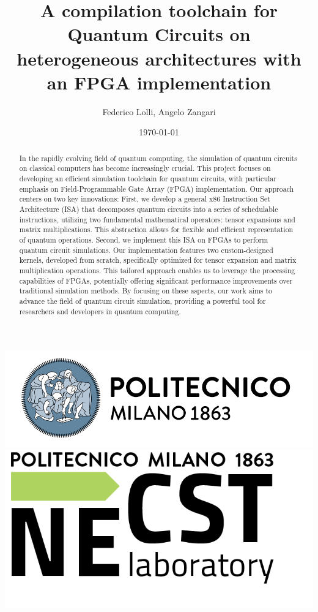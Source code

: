 \documentclass[12pt,oneside,a4paper]{article}
\title{\textbf{A compilation toolchain for Quantum Circuits on heterogeneous architectures with an FPGA implementation}}
\author{Federico Lolli, Angelo Zangari}
\date{\today}
\begin{document}
\begin{titlepage}
    \centering
    \clearpage
    \maketitle
	\thispagestyle{empty}
	\vspace*{1cm}
	\vfill
	\centering
	\includegraphics{logo_polimi.png}\includegraphics{logo_NECST.png}
\end{titlepage}


\begin{abstract}

	In the rapidly evolving field of quantum computing, the simulation of quantum circuits on classical computers has become increasingly crucial. This project focuses on developing an efficient simulation toolchain for quantum circuits, with particular emphasis on Field-Programmable Gate Array (FPGA) implementation. Our approach centers on two key innovations: First, we develop a general x86 Instruction Set Architecture (ISA) that decomposes quantum circuits into a series of schedulable instructions, utilizing two fundamental mathematical operators: tensor expansions and matrix multiplications. This abstraction allows for flexible and efficient representation of quantum operations. Second, we implement this ISA on FPGAs to perform quantum circuit simulations. Our implementation features two custom-designed kernels, developed from scratch, specifically optimized for tensor expansion and matrix multiplication operations. This tailored approach enables us to leverage the  processing capabilities of FPGAs, potentially offering significant performance improvements over traditional simulation methods. By focusing on these aspects, our work aims to advance the field of quantum circuit simulation, providing a powerful tool for researchers and developers in quantum computing.

\end{abstract}
\end{document}
